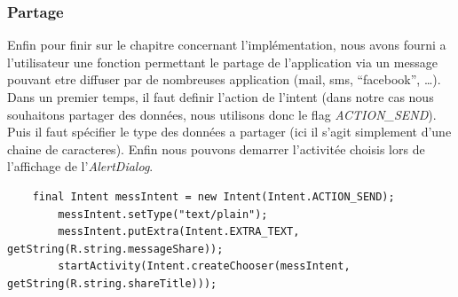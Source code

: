 \subsubsection{Partage}
Enfin pour finir sur le chapitre concernant l'implémentation, nous avons fourni
a l'utilisateur une fonction permettant le partage de l'application via un
message pouvant etre diffuser par de nombreuses application (mail, sms,
``facebook'', \ldots).
Dans un premier temps, il faut definir l'action de l'intent (dans notre cas
nous souhaitons partager des données, nous utilisons donc le flag
\textit{ACTION\_SEND}). Puis il faut spécifier le type des données a partager
(ici il s'agit simplement d'une chaine de caracteres).
Enfin nous pouvons demarrer l'activitée choisis lors de l'affichage de
l'\textit{AlertDialog}.
\begin{lstlisting}
    final Intent messIntent = new Intent(Intent.ACTION_SEND);
	    messIntent.setType("text/plain");
	    messIntent.putExtra(Intent.EXTRA_TEXT, getString(R.string.messageShare));
	    startActivity(Intent.createChooser(messIntent, getString(R.string.shareTitle)));
\end{lstlisting}
